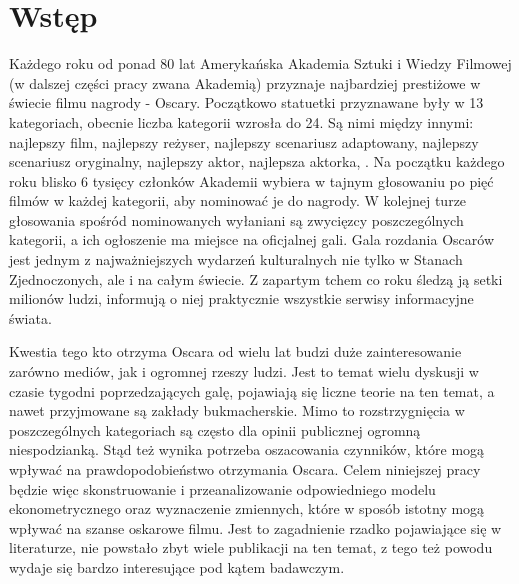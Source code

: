 
\newpage
\chapter*{Wstęp}
 
Każdego roku od ponad 80 lat Amerykańska Akademia Sztuki i Wiedzy Filmowej (w dalszej części pracy zwana Akademią) przyznaje najbardziej prestiżowe w świecie filmu nagrody - Oscary. Początkowo statuetki przyznawane były w 13 kategoriach, obecnie liczba kategorii wzrosła do 24. Są nimi między innymi: najlepszy film, najlepszy reżyser, najlepszy scenariusz adaptowany, najlepszy scenariusz oryginalny, najlepszy aktor, najlepsza aktorka, . Na początku każdego roku blisko 6 tysięcy członków Akademii wybiera w tajnym głosowaniu po pięć filmów w każdej kategorii, aby nominować je do nagrody. W kolejnej turze głosowania spośród nominowanych wyłaniani są zwycięzcy poszczególnych kategorii, a ich ogłoszenie ma miejsce na oficjalnej gali. Gala rozdania Oscarów jest jednym z najważniejszych wydarzeń kulturalnych nie tylko w Stanach Zjednoczonych, ale i na całym świecie. Z zapartym tchem co roku śledzą ją setki milionów ludzi, informują o niej praktycznie wszystkie serwisy informacyjne świata. 

Kwestia tego kto otrzyma Oscara od wielu lat budzi duże zainteresowanie zarówno mediów, jak i ogromnej rzeszy ludzi. Jest to temat wielu dyskusji w czasie tygodni poprzedzających galę, pojawiają się liczne teorie na ten temat, a nawet przyjmowane są zakłady bukmacherskie. Mimo to rozstrzygnięcia w poszczególnych kategoriach są często dla opinii publicznej ogromną niespodzianką. Stąd też wynika potrzeba oszacowania czynników, które mogą wpływać na prawdopodobieństwo otrzymania Oscara. Celem niniejszej pracy będzie więc skonstruowanie i przeanalizowanie odpowiedniego modelu ekonometrycznego oraz wyznaczenie zmiennych, które w sposób istotny mogą wpływać na szanse oskarowe filmu. Jest to zagadnienie rzadko pojawiające się w literaturze, nie powstało zbyt wiele publikacji na ten temat, z tego też powodu wydaje się bardzo interesujące pod kątem badawczym.

